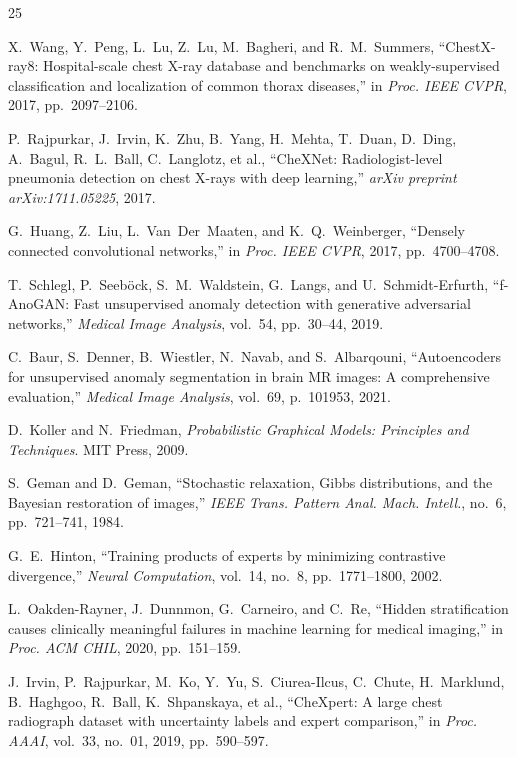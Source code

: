 \documentclass[conference]{IEEEtran}
\renewenvironment{thebibliography}[1]{%
  \begin{oldthebibliography}{#1}%
    \setlength{\itemsep}{0.3pt}%
    \setlength{\parskip}{0pt}%
}{%
  \end{oldthebibliography}%
}
\begin{document}
\begin{thebibliography}{25}
X.~Wang, Y.~Peng, L.~Lu, Z.~Lu, M.~Bagheri, and R.~M.~Summers, ``ChestX-ray8: Hospital-scale chest X-ray database and benchmarks on weakly-supervised classification and localization of common thorax diseases,'' in \textit{Proc. IEEE CVPR}, 2017, pp.~2097--2106.

P.~Rajpurkar, J.~Irvin, K.~Zhu, B.~Yang, H.~Mehta, T.~Duan, D.~Ding, A.~Bagul, R.~L.~Ball, C.~Langlotz, et al., ``CheXNet: Radiologist-level pneumonia detection on chest X-rays with deep learning,'' \textit{arXiv preprint arXiv:1711.05225}, 2017.

G.~Huang, Z.~Liu, L.~Van~Der~Maaten, and K.~Q.~Weinberger, ``Densely connected convolutional networks,'' in \textit{Proc. IEEE CVPR}, 2017, pp.~4700--4708.

T.~Schlegl, P.~Seeb{\"o}ck, S.~M.~Waldstein, G.~Langs, and U.~Schmidt-Erfurth, ``f-AnoGAN: Fast unsupervised anomaly detection with generative adversarial networks,'' \textit{Medical Image Analysis}, vol.~54, pp.~30--44, 2019.

C.~Baur, S.~Denner, B.~Wiestler, N.~Navab, and S.~Albarqouni, ``Autoencoders for unsupervised anomaly segmentation in brain MR images: A comprehensive evaluation,'' \textit{Medical Image Analysis}, vol.~69, p.~101953, 2021.

D.~Koller and N.~Friedman, \textit{Probabilistic Graphical Models: Principles and Techniques}. MIT Press, 2009.

S.~Geman and D.~Geman, ``Stochastic relaxation, Gibbs distributions, and the Bayesian restoration of images,'' \textit{IEEE Trans. Pattern Anal. Mach. Intell.}, no.~6, pp.~721--741, 1984.

G.~E.~Hinton, ``Training products of experts by minimizing contrastive divergence,'' \textit{Neural Computation}, vol.~14, no.~8, pp.~1771--1800, 2002.

L.~Oakden-Rayner, J.~Dunnmon, G.~Carneiro, and C.~Re, ``Hidden stratification causes clinically meaningful failures in machine learning for medical imaging,'' in \textit{Proc. ACM CHIL}, 2020, pp.~151--159.

J.~Irvin, P.~Rajpurkar, M.~Ko, Y.~Yu, S.~Ciurea-Ilcus, C.~Chute, H.~Marklund, B.~Haghgoo, R.~Ball, K.~Shpanskaya, et al., ``CheXpert: A large chest radiograph dataset with uncertainty labels and expert comparison,'' in \textit{Proc. AAAI}, vol.~33, no.~01, 2019, pp.~590--597.


\end{thebibliography}
\end{document}

